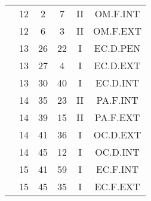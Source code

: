 \documentclass[12pt, a4paper]{article}
\begin{document}
\begin{multicols}{3}
{\begin{tabular}{c c c c c c}
	 	 	 	 & 12 & 2 & 7 & II & OM.F.INT\\%
	 	 	 	 & 12 & 6 & 3 & II & OM.F.EXT\\%
	 	 	 	 & 13 & 26 & 22 & I & EC.D.PEN\\%
	 	 	 	 & 13 & 27 & 4 & I & EC.D.EXT\\%
	 	 	 	 & 13 & 30 & 40 & I & EC.D.INT\\%
	 	 	 	 & 14 & 35 & 23 & II & PA.F.INT\\%
	 	 	 	 & 14 & 39 & 15 & II & PA.F.EXT\\%
	 	 	 	 & 14 & 41 & 36 & I & OC.D.EXT\\%
	 	 	 	 & 14 & 45 & 12 & I & OC.D.INT\\%
	 	 	 	 & 15 & 41 & 59 & I & EC.F.INT\\%
	 	 	 	 & 15 & 45 & 35 & I & EC.F.EXT\\%
	 	 \end{tabular}
 	}
\end{multicols}
\end{document}
